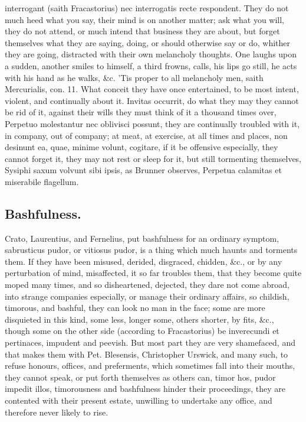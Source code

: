 {interrogant (saith Fracastorius) nec interrogatis recte
respondent. They do not much heed what you say, their mind is on
another matter; ask what you will, they do not attend, or much intend
that business they are about, but forget themselves what they are
saying, doing, or should otherwise say or do, whither they are going,
distracted with their own melancholy thoughts. One laughs upon a
sudden, another smiles to himself, a third frowns, calls, his lips go
still, he acts with his hand as he walks, \&c. 'Tis proper to all
melancholy men, saith Mercurialis, con. 11. What conceit they
have once entertained, to be most intent, violent, and continually
about it. Invitas occurrit, do what they may they cannot be rid of it,
against their wills they must think of it a thousand times over,
Perpetuo molestantur nec oblivisci possunt, they are continually
troubled with it, in company, out of company; at meat, at exercise, at
all times and places, non desinunt ea, quae, minime volunt,
cogitare, if it be offensive especially, they cannot forget it, they
may not rest or sleep for it, but still tormenting themselves, Sysiphi
saxum volvunt sibi ipsis, as Brunner observes, Perpetua calamitas
et miserabile flagellum.

\subsection{Bashfulness.}
Crato, Laurentius, and Fernelius, put
bashfulness for an ordinary symptom, sabrusticus pudor, or vitiosus
pudor, is a thing which much haunts and torments them. If they have
been misused, derided, disgraced, chidden, \&c., or by any perturbation
of mind, misaffected, it so far troubles them, that they become quite
moped many times, and so disheartened, dejected, they dare not come
abroad, into strange companies especially, or manage their ordinary
affairs, so childish, timorous, and bashful, they can look no man in
the face; some are more disquieted in this kind, some less, longer
some, others shorter, by fits, \&c., though some on the other side
(according to Fracastorius) be inverecundi et pertinaces,
impudent and peevish. But most part they are very shamefaced, and that
makes them with Pet. Blesensis, Christopher Urswick, and many such, to
refuse honours, offices, and preferments, which sometimes fall into
their mouths, they cannot speak, or put forth themselves as others can,
timor hos, pudor impedit illos, timorousness and bashfulness hinder
their proceedings, they are contented with their present estate,
unwilling to undertake any office, and therefore never likely to rise.

}
